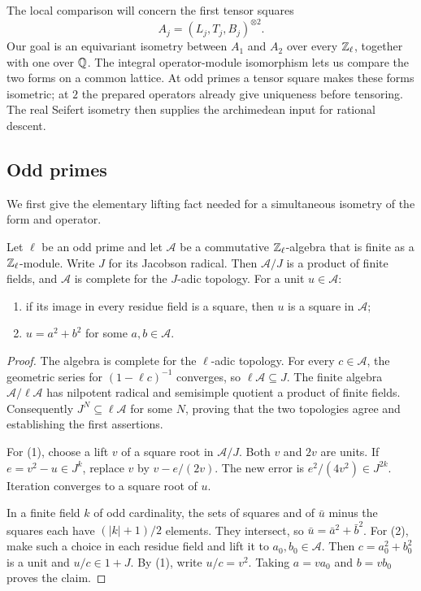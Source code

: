 The local comparison will concern the first tensor squares
\[
 A_j=(L_j,T_j,B_j)^{\otimes2}.
\]
Our goal is an equivariant isometry between $A_1$ and $A_2$ over every
$\mathbb Z_\ell$, together with one over $\mathbb Q$.  The integral operator-module
isomorphism lets us compare the two forms on a common lattice.  At odd
primes a tensor square makes these forms isometric; at $2$ the prepared
operators already give uniqueness before tensoring.  The real Seifert
isometry then supplies the archimedean input for rational descent.

\subsection{Odd primes}

We first give the elementary lifting fact needed for a simultaneous
isometry of the form and operator.

\begin{lemma}\label{local:lifting}
Let $\ell$ be an odd prime and let $\mathcal A$ be a commutative
$\mathbb Z_\ell$-algebra that is finite as a $\mathbb Z_\ell$-module.  Write $J$ for
its Jacobson radical.  Then $\mathcal A/J$ is a product of finite fields,
and $\mathcal A$ is complete for the $J$-adic topology.  For a unit
$u\in\mathcal A$:
\begin{enumerate}
\item if its image in every residue field is a square, then $u$ is a
square in $\mathcal A$;
\item $u=a^2+b^2$ for some $a,b\in\mathcal A$.
\end{enumerate}
\end{lemma}

\begin{proof}
The algebra is complete for the $\ell$-adic topology.  For every
$c\in\mathcal A$, the geometric series for $(1-\ell c)^{-1}$ converges,
so $\ell\mathcal A\subseteq J$.  The finite algebra
$\mathcal A/\ell\mathcal A$ has nilpotent radical and semisimple quotient
a product of finite fields.  Consequently $J^N\subseteq\ell\mathcal A$
for some $N$, proving that the two topologies agree and establishing the
first assertions.

For (1), choose a lift $v$ of a square root in $\mathcal A/J$.
Both $v$ and $2v$ are units.  If $e=v^2-u\in J^k$, replace $v$ by
$v-e/(2v)$.  The new error is $e^2/(4v^2)\in J^{2k}$.
Iteration converges to a square root of $u$.

In a finite field $k$ of odd cardinality, the sets of squares and of
$\bar u$ minus the squares each have $(|k|+1)/2$ elements.  They
intersect, so $\bar u=\bar a^2+\bar b^2$.  For (2), make such a
choice in each residue field and lift it to $a_0,b_0\in\mathcal A$.
Then $c=a_0^2+b_0^2$ is a unit and $u/c\in1+J$.  By (1), write
$u/c=v^2$.  Taking $a=va_0$ and $b=vb_0$ proves the claim.
\end{proof}

